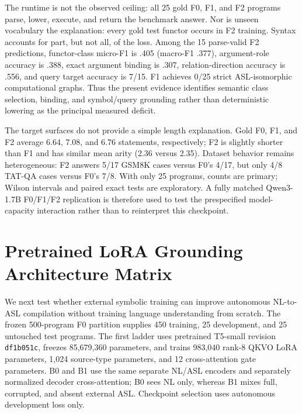 \documentclass[11pt]{article}
\begin{document}
The runtime is not the observed ceiling: all 25 gold F0, F1, and F2 programs
parse, lower, execute, and return the benchmark answer. Nor is unseen vocabulary
the explanation: every gold test functor occurs in F2 training. Syntax accounts
for part, but not all, of the loss. Among the 15 parse-valid F2 predictions,
functor-class micro-F1 is .405 (macro-F1 .377), argument-role accuracy is .388,
exact argument binding is .307, relation-direction accuracy is .556, and query
target accuracy is 7/15. F1 achieves 0/25 strict ASL-isomorphic computational
graphs. Thus the present evidence identifies semantic class selection, binding,
and symbol/query grounding rather than deterministic lowering as the principal
measured deficit.

The target surfaces do not provide a simple length explanation. Gold F0, F1,
and F2 average 6.64, 7.08, and 6.76 statements, respectively; F2 is slightly
shorter than F1 and has similar mean arity (2.36 versus 2.35). Dataset behavior
remains heterogeneous: F2 answers 5/17 GSM8K cases versus F0's 4/17, but only
4/8 TAT-QA cases versus F0's 7/8. With only 25 programs, counts are primary;
Wilson intervals and paired exact tests are exploratory. A fully matched
Qwen3-1.7B F0/F1/F2 replication is therefore used to test the prespecified
model-capacity interaction rather than to reinterpret this checkpoint.

\section{Pretrained LoRA Grounding Architecture Matrix}

We next test whether external symbolic training can improve autonomous
NL-to-ASL compilation without training language understanding from scratch.
The frozen 500-program F0 partition supplies 450 training, 25 development, and
25 untouched test programs. The first ladder uses pretrained T5-small revision
\texttt{df1b051c}, freezes 85,679,360 parameters, and trains 983,040 rank-8
QKVO LoRA parameters, 1,024 source-type parameters, and 12 cross-attention gate
parameters. B0 and B1 use the same separate NL/ASL encoders and separately
normalized decoder cross-attention; B0 sees NL only, whereas B1 mixes full,
corrupted, and absent external ASL. Checkpoint selection uses autonomous
development loss only.
\end{document}
